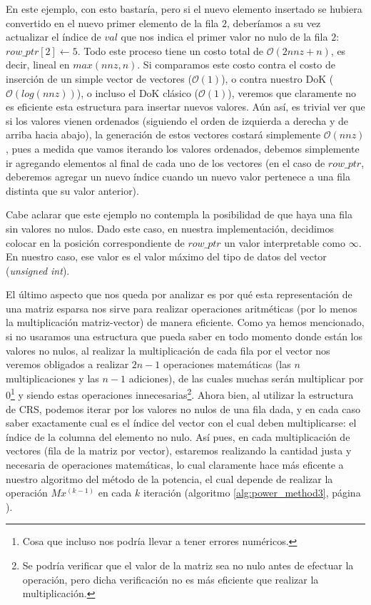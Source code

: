 \par En este ejemplo, con esto bastar\'ia, pero si el nuevo elemento insertado
se hubiera convertido en el nuevo primer elemento de la fila $2$, deber\'iamos a
su vez actualizar el \'indice de $val$ que nos indica el primer valor no nulo de
la fila $2$: $row\_ptr[2] \gets 5$. Todo este proceso tiene un costo total de
$\mathcal{O}(2nnz+n)$, es decir, lineal en $max(nnz,n)$. Si comparamos este
costo contra el costo de inserci\'on de un simple vector de vectores
($\mathcal{O}(1)$), o contra nuestro DoK ($\mathcal{O}(log(nnz))$), o incluso el
DoK cl\'asico ($\mathcal{O}(1)$), veremos que claramente no es eficiente esta
estructura para insertar nuevos valores. A\'un as\'i, es trivial ver que si los
valores vienen ordenados (siguiendo el orden de izquierda a derecha y de arriba
hacia abajo), la generaci\'on de estos vectores costar\'a simplemente
$\mathcal{O}(nnz)$, pues a medida que vamos iterando los valores ordenados,
debemos simplemente ir agregando elementos al final de cada uno de los vectores
(en el caso de $row\_ptr$, deberemos agregar un nuevo \'indice cuando un nuevo
valor pertenece a una fila distinta que su valor anterior).

\par Cabe aclarar que este ejemplo no contempla la posibilidad de que haya una
fila sin valores no nulos. Dado este caso, en nuestra implementaci\'on,
decidimos colocar en la posici\'on correspondiente de $row\_ptr$ un valor
interpretable como $\infty$. En nuestro caso, ese valor es el valor m\'aximo del
tipo de datos del vector (\emph{unsigned int})\cite{stl_limits}.

\par El \'ultimo aspecto que nos queda por analizar es por qu\'e esta
representaci\'on de una matriz esparsa nos sirve para realizar operaciones
aritm\'eticas (por lo menos la multiplicaci\'on matriz-vector) de manera
eficiente. Como ya hemos mencionado, si no usaramos una estructura que pueda
saber en todo momento donde est\'an los valores no nulos, al realizar la
multiplicaci\'on de cada fila por el vector nos veremos obligados a realizar
$2n-1$ operaciones matem\'aticas (las $n$ multiplicaciones y las $n-1$
adiciones), de las cuales muchas ser\'an multiplicar por $0$\footnote{Cosa que
incluso nos podr\'ia llevar a tener errores num\'ericos.} y siendo estas
operaciones innecesarias\footnote{Se podr\'ia verificar que el valor de la
matriz sea no nulo antes de efectuar la operaci\'on, pero dicha verificaci\'on
no es m\'as eficiente que realizar la multiplicaci\'on.}. Ahora bien, al
utilizar la estructura de CRS, podemos iterar por los valores no nulos de una
fila dada, y en cada caso saber exactamente cual es el \'indice del vector con
el cual deben multiplicarse: el \'indice de la columna del elemento no nulo.
As\'i pues, en cada multiplicaci\'on de vectores (fila de la matriz por vector),
estaremos realizando la cantidad justa y necesaria de operaciones matem\'aticas,
lo cual claramente hace m\'as eficente a nuestro algoritmo del m\'etodo de la
potencia, el cual depende de realizar la operaci\'on $Mx^{(k-1)}$ en cada $k$
iteraci\'on (algoritmo \ref{alg:power_method3}, p\'agina
\pageref{alg:power_method3}).


